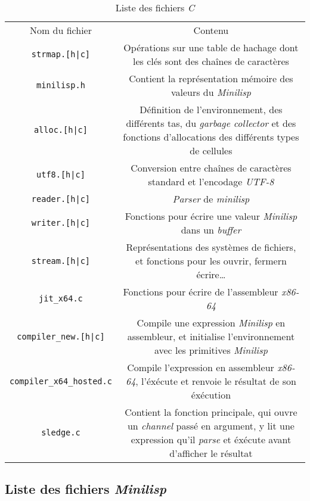 \documentclass[a4paper, 10pt, french]{article}
\newcommand{\code}[1]{\texttt{#1}}
\newcommand{\foreign}[1]{\emph{#1}}
\begin{document}
\begin{table}[H]
  \centering
  \begin{tabularx}{\linewidth}{|C|C|}
    \hline
    Nom du fichier & Contenu \tabularnewline
    \hhline{|=|=|}
    \code{strmap.[h|c]} & Opérations sur une table de hachage dont les clés sont des chaînes de caractères \tabularnewline
    \hhline{|=|=|}
    \code{minilisp.h} & Contient la représentation mémoire des valeurs du \foreign{Minilisp} \tabularnewline
    \hhline{|=|=|}
    \code{alloc.[h|c]} & Définition de l'environnement, des différents tas, du \foreign{garbage collector} et des fonctions d'allocations des différents types de cellules \tabularnewline
    \hhline{|=|=|}
    \code{utf8.[h|c]} & Conversion entre chaînes de caractères standard et l'encodage \foreign{UTF-8} \tabularnewline
    \hline
    \code{reader.[h|c]} & \foreign{Parser} de \foreign{minilisp} \tabularnewline
    \hline
    \code{writer.[h|c]} & Fonctions pour écrire une valeur \foreign{Minilisp} dans un \foreign{buffer} \tabularnewline
    \hline
    \code{stream.[h|c]} & Représentations des systèmes de fichiers, et fonctions pour les ouvrir, fermern écrire\ldots \tabularnewline
    \hhline{|=|=|}
    \code{jit\_x64.c} & Fonctions pour écrire de l'assembleur \foreign{x86-64} \tabularnewline
    \hline
    \code{compiler\_new.[h|c]} & Compile une expression \foreign{Minilisp} en assembleur, et initialise l'environnement avec les primitives \foreign{Minilisp} \tabularnewline
    \hline
    \code{compiler\_x64\_hosted.c} & Compile l'expression en assembleur \foreign{x86-64}, l'éxécute et renvoie le résultat de son éxécution \tabularnewline
    \hhline{|=|=|}
    \code{sledge.c} & Contient la fonction principale, qui ouvre un \foreign{channel} passé en argument, y lit une expression qu'il \foreign{parse} et éxécute avant d'afficher le résultat \tabularnewline
    \hline
  \end{tabularx}
  \caption{Liste des fichiers \foreign{C}}
\end{table}

\subsection{Liste des fichiers \foreign{Minilisp}}
\end{document}
